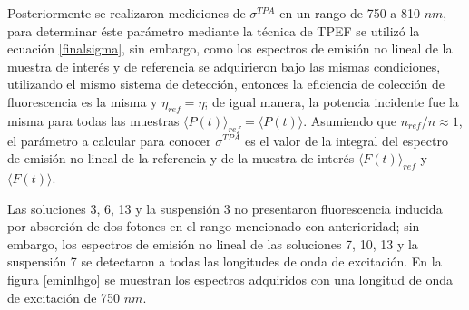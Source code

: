 \begin{table}[h]
\centering
{} 
\caption{ Valores obtenidos de eficiencia cu\'antica de fluorescencia $\Phi_f$ de las soluciones 3, 6, 7, 10 y 13 y las suspensiones 3 y 7.\label{tablahgo}}
\end{table}

Posteriormente se realizaron mediciones de $\sigma^{TPA}$ en un rango de 750 a 810 $nm$, para determinar \'este par\'ametro mediante la t\'ecnica de TPEF se utiliz\'o la ecuaci\'on \ref{finalsigma}, sin embargo, como los espectros de emisi\'on no lineal de la muestra de inter\'es y de referencia se adquirieron bajo las mismas condiciones, utilizando el mismo sistema de detecci\'on, entonces la eficiencia de colecci\'on de fluorescencia es la misma y $\eta_{ref}=\eta$; de igual manera, la potencia incidente fue la misma para todas las muestras $\langle P(t)\rangle_{ref}=\langle P(t)\rangle$. Asumiendo que $n_{ref}/n\approx 1$, el par\'ametro a calcular para conocer $\sigma^{TPA}$ es el valor de la integral del espectro de emisi\'on no lineal de la referencia y de la muestra de inter\'es $\langle F(t)\rangle_{ref}$ y $\langle F(t)\rangle$.

Las soluciones 3, 6, 13 y la suspensi\'on 3 no presentaron fluorescencia inducida por absorci\'on de dos fotones en el rango mencionado con anterioridad; sin embargo, los espectros de emisi\'on no lineal de las soluciones 7, 10, 13 y la suspensi\'on 7 se detectaron a todas las longitudes de onda de excitaci\'on. En la figura \ref{eminlhgo} se muestran los espectros adquiridos con una longitud de onda de excitaci\'on de 750 $nm$. 

